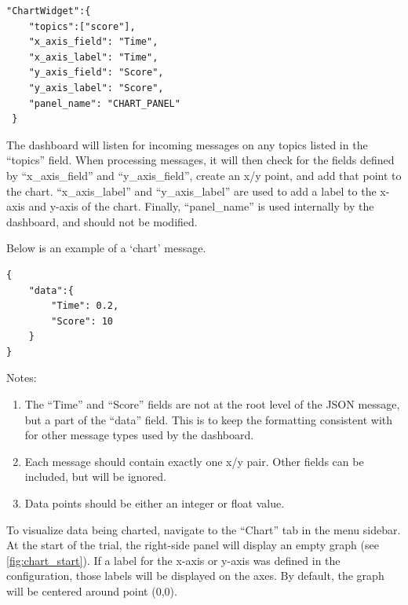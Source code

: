 \begin{verbatim}
"ChartWidget":{
    "topics":["score"],
    "x_axis_field": "Time",
    "x_axis_label": "Time",
    "y_axis_field": "Score",
    "y_axis_label": "Score",
    "panel_name": "CHART_PANEL"
 }
\end{verbatim}

The dashboard will listen for incoming messages on any topics listed in the
``topics'' field. When processing messages, it will then check for the fields
defined by ``x\_axis\_field'' and ``y\_axis\_field”, create an x/y point, and
add that point to the chart. ``x\_axis\_label'' and ``y\_axis\_label'' are used to
add a label to the x-axis and y-axis of the chart. Finally, ``panel\_name'' is
used internally by the dashboard, and should not be modified.  

Below is an example of a `chart' message.

\begin{verbatim}
{
    "data":{
        "Time": 0.2,
        "Score": 10
    }
}
\end{verbatim}

Notes:

\begin{enumerate}

    \item The ``Time” and ``Score” fields are not at the root level of the JSON
        message, but a part of the ``data” field. This is to keep the
        formatting consistent with for other message types used by the
        dashboard.

    \item Each message should contain exactly one x/y pair. Other fields can be
        included, but will be ignored.

    \item Data points should be either an integer or float value.

\end{enumerate}

To visualize data being charted, navigate to the ``Chart'' tab in the menu
sidebar. At the start of the trial, the right-side panel will display an empty
graph (see \autoref{fig:chart_start}). If a label for the x-axis or y-axis was
defined in the configuration, those labels will be displayed on the axes.  By
default, the graph will be centered around point (0,0). 

